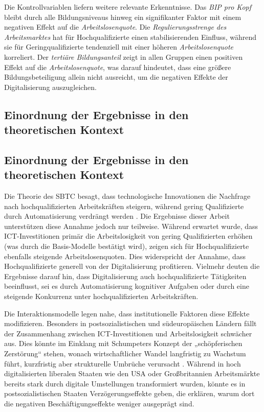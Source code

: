 Die Kontrollvariablen liefern weitere relevante Erkenntnisse. Das 
\textit{\ac{BIP} pro Kopf} bleibt durch alle Bildungsniveaus hinweg ein signifikanter 
Faktor mit einem negativen Effekt auf die \textit{Arbeitslosenquote}. Die 
\textit{Regulierungsstrenge des Arbeitsmarktes} hat für Hochqualifizierte einen 
stabilisierenden Einfluss, während sie für Geringqualifizierte tendenziell mit einer 
höheren \textit{Arbeitslosenquote} korreliert. Der \textit{tertiäre Bildungsanteil} zeigt 
in allen Gruppen einen positiven Effekt auf die \textit{Arbeitslosenquote}, was darauf 
hindeutet, dass eine größere Bildungsbeteiligung allein nicht ausreicht, um die negativen 
Effekte der Digitalisierung auszugleichen.

\subsection{Einordnung der Ergebnisse in den theoretischen Kontext}

\subsection{Einordnung der Ergebnisse in den theoretischen Kontext}

Die Theorie des \ac{SBTC} besagt, dass technologische Innovationen die Nachfrage nach 
hochqualifizierten Arbeitskräften steigern, während gering Qualifizierte durch 
Automatisierung verdrängt werden \parencite[vgl.][S. 7]{acemoglu2002technical}. Die 
Ergebnisse dieser Arbeit unterstützen diese Annahme jedoch nur teilweise. Während 
erwartet wurde, dass \ac{ICT}-Investitionen primär die Arbeitslosigkeit von gering 
Qualifizierten erhöhen (was durch die Basis-Modelle bestätigt wird), zeigen sich für 
Hochqualifizierte ebenfalls steigende Arbeitslosenquoten. Dies widerspricht der Annahme, 
dass Hochqualifizierte generell von der Digitalisierung profitieren. Vielmehr deuten die 
Ergebnisse darauf hin, dass Digitalisierung auch hochqualifizierte Tätigkeiten 
beeinflusst, sei es durch Automatisierung kognitiver Aufgaben oder durch eine steigende 
Konkurrenz unter hochqualifizierten Arbeitskräften.

Die Interaktionsmodelle legen nahe, dass institutionelle Faktoren diese Effekte 
modifizieren. Besonders in postsozialistischen und südeuropäischen Ländern fällt der 
Zusammenhang zwischen \ac{ICT}-Investitionen und Arbeitslosigkeit schwächer aus. Dies 
könnte im Einklang mit Schumpeters Konzept der „schöpferischen Zerstörung“ stehen, 
wonach wirtschaftlicher Wandel langfristig zu Wachstum führt, kurzfristig aber 
strukturelle Umbrüche verursacht \parencite[vgl.][S. 103-105]{schumpeter1976capitalism}. 
Während in hoch digitalisierten liberalen Staaten wie den USA oder Großbritannien 
Arbeitsmärkte bereits stark durch digitale Umstellungen transformiert wurden, könnte es 
in postsozialistischen Staaten Verzögerungseffekte geben, die erklären, warum dort die 
negativen Beschäftigungseffekte weniger ausgeprägt sind.

